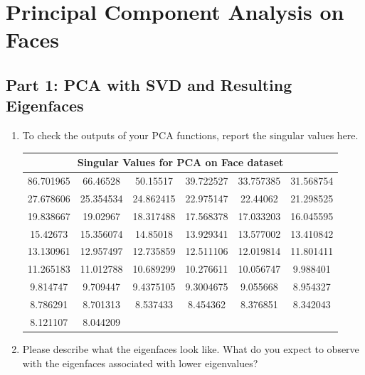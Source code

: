
\section{Principal Component Analysis on Faces}
\subsection{Part 1: PCA with SVD and Resulting Eigenfaces}
\begin{enumerate}
    \item To check the outputs of your PCA functions, report the singular values here.
\begin{table}[H]
	\centering
	\begin{tabular}{@{}|c|c|c|c|c|c|@{}}
		\toprule
		\multicolumn{6}{|c|}{\textbf{Singular Values for PCA on Face dataset}} \\ \midrule
		86.701965  & 66.46528  & 50.15517  & 39.722527 & 33.757385 & 31.568754 \\ \midrule
		27.678606  & 25.354534 & 24.862415 & 22.975147 & 22.44062  & 21.298525 \\ \midrule
		19.838667  & 19.02967  & 18.317488 & 17.568378 & 17.033203 & 16.045595 \\ \midrule
		15.42673   & 15.356074 & 14.85018  & 13.929341 & 13.577002 & 13.410842 \\ \midrule
		13.130961  & 12.957497 & 12.735859 & 12.511106 & 12.019814 & 11.801411 \\ \midrule
		11.265183  & 11.012788 & 10.689299 & 10.276611 & 10.056747 & 9.988401  \\ \midrule
		9.814747   & 9.709447  & 9.4375105 & 9.3004675 & 9.055668  & 8.954327  \\ \midrule
		8.786291   & 8.701313  & 8.537433  & 8.454362  & 8.376851  & 8.342043  \\ \midrule
		8.121107   & 8.044209  &           &           &           &           \\ \bottomrule
	\end{tabular}
\end{table}
    \item Please describe what the eigenfaces look like. What do you expect to observe with the eigenfaces associated with lower eigenvalues?
    \newline
    \newline

\end{enumerate}
